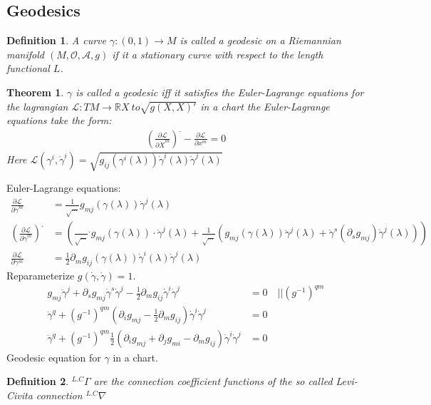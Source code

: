 \documentclass[10pt, oneside]{article}
\newcommand{\R}{\mathbb{R}}
\newtheorem{thm}{Theorem}
\newtheorem{defn}{Definition}
\begin{document}
\subsection{Geodesics}
\begin{defn}
A curve $\gamma: (0,1) \to M$ is called a geodesic on a Riemannian manifold $(M,\mathcal{O},\mathcal{A},g)$ if it a stationary curve with respect to the length functional $L$.
\end{defn}
\begin{thm}
$\gamma$ is called a geodesic iff it satisfies the Euler-Lagrange equations for the lagrangian $\mathcal{L} : TM \to \R X\ to \sqrt{g(X,X)'}$ in a chart the Euler-Lagrange equations take the form:
\begin{align*}
  (\frac{\partial\mathcal{L}}{\partial \dot{X}^m})^. - \frac{\partial \mathcal{L}}{\partial x^m} = 0
\end{align*}
Here $\mathcal{L}(\gamma^i, \dot{\gamma}^i)= \sqrt{g_{ij}(\gamma^i(\lambda))\dot{\gamma}^i(\lambda)\dot{\gamma}^j(\lambda)}$
\end{thm}
Euler-Lagrange equations:
\begin{align*}
  \frac{\partial \mathcal{L}}{\partial \dot{\gamma}^m} &= \frac{1}{\sqrt{\dots}} g_{mj}(\gamma(\lambda))\dot{\gamma}^j(\lambda) \\
  (\frac{\partial \mathcal{L}}{\partial \dot{\gamma}^m})^. &= (\frac{}{ \sqrt{\dots}}^. g_{mj} (\gamma(\lambda)) \cdot \dot{\gamma}^j(\lambda) + \frac{1}{\sqrt{\dots}}(g_{mj}(\gamma(\lambda))\ddot{\gamma}^j(\lambda)+\dot{\gamma}^s(\partial_s g_{mj})\dot{\gamma}^j (\lambda))) \\
  \frac{\partial \mathcal{L}}{\partial \gamma^m} &= \frac{1}{2} \partial_m g_{ij} (\gamma(\lambda))\dot{\gamma}^i (\lambda) \dot{\gamma}^j (\lambda)
\end{align*}
Reparameterize $g(\dot{\gamma},\dot{\gamma})=1$.
\begin{align*}
g_{mj} \ddot{\gamma}^j + \partial_s g_{mj} \dot{\gamma}^s \dot{\gamma}^j - \frac{1}{2} \partial_m g_{ij} \dot{\gamma}^i \dot{\gamma}^j &= 0 \quad ||(g^{-1})^{qm} \\
  \ddot{\gamma}^q + (g^{-1})^{qm} \left(\partial_i g_{mj} - \frac{1}{2} \partial_m g_{ij} \right) \dot{\gamma}^i \dot{\gamma}^j &= 0 \\
  \ddot{\gamma}^q + (g^{-1})^{qm} \frac{1}{2}(\partial_i g_{mj} + \partial_{j} g_{mi} -\partial_m g_{ij}) \dot{\gamma}^i \dot{\gamma}^j &= 0
\end{align*}
Geodesic equation for $\gamma$ in a chart.
\begin{defn}
$^{L.C}\Gamma$ are the connection coefficient functions of the so called Levi-Civita connection $^{L.C}\nabla$
\end{defn}
\end{document}
